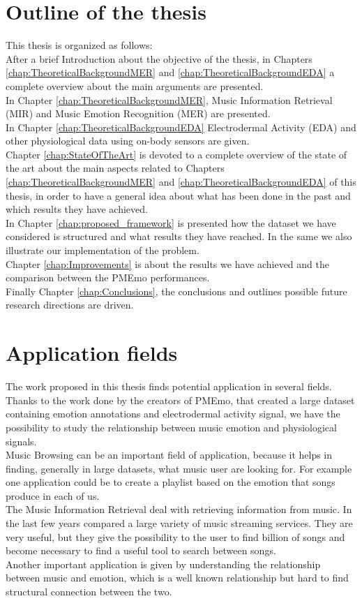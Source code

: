 \section{Outline of the thesis}
This thesis is organized as follows:
\\ \indent
After a brief Introduction about the objective of the thesis, in Chapters \ref{chap:TheoreticalBackgroundMER} and \ref{chap:TheoreticalBackgroundEDA} a complete overview about the main arguments are presented.
\\
In Chapter \ref{chap:TheoreticalBackgroundMER}, Music Information Retrieval (MIR) and Music Emotion Recognition (MER) are presented.
\\
In Chapter \ref{chap:TheoreticalBackgroundEDA} Electrodermal Activity (EDA) and other physiological data using on-body sensors are given.
\\ \indent
Chapter \ref{chap:StateOfTheArt} is devoted to a complete overview of the state of the art about the main aspects related to Chapters \ref{chap:TheoreticalBackgroundMER} and \ref{chap:TheoreticalBackgroundEDA} of this thesis, in order to have a general idea about what has been done in the past and which results they have achieved.
\\ \indent
In Chapter \ref{chap:proposed_framework} is presented how the dataset we have considered is structured and what results they have reached. In the same  we also illustrate our implementation of the problem.
\\ \indent
Chapter \ref{chap:Improvements} is about the results we have achieved and the comparison between the PMEmo performances.
\\ \indent
Finally Chapter \ref{chap:Conclusions}, the conclusions and outlines possible future research directions are driven.

\section{Application fields}
\indent
The work proposed in this thesis finds potential application in several fields. Thanks to the work done by the creators of PMEmo, that created a large dataset containing emotion annotations and electrodermal activity signal, we have the possibility to study the relationship between music emotion and physiological signals.
\\
Music Browsing can be an important field of application, because it helps in finding, generally in large datasets, what music user are looking for. For example one application could be to create a playlist based on the emotion that songs produce in each of us.
\\ \indent
The Music Information Retrieval deal with retrieving information from music. In the last few years compared a large variety of music streaming services. They are very useful, but they give the possibility to the user to find billion of songs and become necessary to find a useful tool to search between songs. 
\\ \indent
Another important application is given by understanding the relationship between music and emotion, which is a well known relationship but hard to find structural connection between the two.